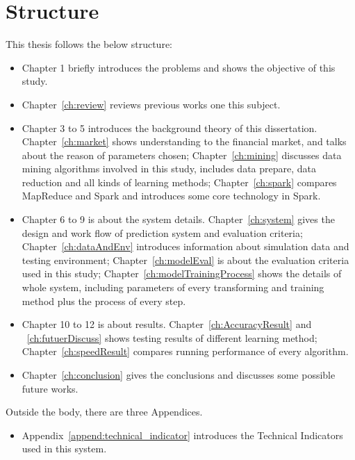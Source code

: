 \section{Structure}
This thesis follows the below structure:
\begin{itemize}
	\item Chapter 1 briefly introduces the problems and shows the objective of this study.
	\item Chapter~\ref{ch:review} reviews previous works one this subject.
	\item Chapter 3 to 5 introduces the background theory of this dissertation. Chapter~\ref{ch:market} shows understanding to the financial market, and talks about the reason of parameters chosen; Chapter~\ref{ch:mining} discusses data mining algorithms involved in this study, includes data prepare, data reduction and all kinds of learning methods; Chapter~\ref{ch:spark} compares MapReduce and Spark and introduces some core technology in Spark. 
	\item Chapter 6 to 9 is about the system details. Chapter~\ref{ch:system} gives the design and work flow of prediction system and evaluation criteria; Chapter~\ref{ch:dataAndEnv} introduces information about simulation data and testing environment; Chapter~\ref{ch:modelEval} is about the evaluation criteria used in this study; Chapter~\ref{ch:modelTrainingProcess} shows the details of whole system, including parameters of every transforming and training method plus the process of every step.
	\item Chapter 10 to 12 is about results.  Chapter~\ref{ch:AccuracyResult} and ~\ref{ch:futuerDiscuss} shows testing results of different learning method; Chapter~\ref{ch:speedResult} compares running performance of every algorithm.
	\item Chapter~\ref{ch:conclusion} gives the conclusions and discusses some possible future works.
\end{itemize}

Outside the body, there are three Appendices.
\begin{itemize}
	\item Appendix~\ref{append:technical_indicator} introduces the Technical Indicators used in this system.
\end{itemize}